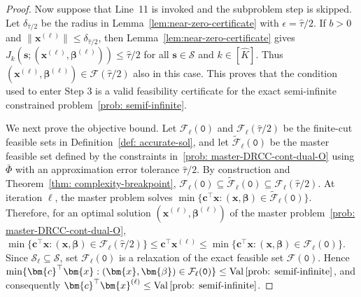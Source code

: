 \documentclass[opre,sglanonrev]{informs4}
\newcommand{\mF}{\mathcal{F}}
\newcommand{\mS}{\mathcal{S}}
\newcommand{\bbeta}{\bm{\beta}}
\newcommand{\bc}{\bm{c}}
\newcommand{\bs}{\bm{s}}
\newcommand{\bx}{\bm{x}}
\newcommand{\Val}{\operatorname{Val}}
\begin{document}
{\begin{proof}
Now suppose that Line~11 is invoked and the subproblem step is skipped. Let
\(\delta_{\hat{\tau}/2}\) be the radius in
Lemma~\ref{lem:near-zero-certificate} with \(\epsilon=\hat{\tau}/2\). If
\(b>0\) and \(\|\bx^{(\ell)}\|\le\delta_{\hat{\tau}/2}\), then
Lemma~\ref{lem:near-zero-certificate} gives
\(J_k(\bs;(\bx^{(\ell)},\bbeta^{(\ell)}))\le\hat{\tau}/2\) for all
\(\bs\in\mS\) and \(k\in[\hat K]\). Thus
\((\bx^{(\ell)},\bbeta^{(\ell)})\in\mF(\hat{\tau}/2)\) also in this case.
This proves that the condition used to enter Step 3 is a valid feasibility certificate for the
exact semi-infinite constrained problem~\eqref{prob: semif-infinite}.

We next prove the objective bound. Let \(\mF_\ell(\mathtt{0})\) and
\(\mF_\ell(\hat{\tau}/2)\) be the finite-cut feasible sets in
Definition~\ref{def: accurate-sol}, and let
\(\widetilde{\mF}_\ell(\mathtt{0})\) be the master feasible set defined by the constraints in~\eqref{prob: master-DRCC-cont-dual-O} using \(\bar\Phi\) with an approximation error tolerance $\hat{\tau}/2$. By construction and Theorem~\ref{thm: complexity-breakpoint},
\(\mF_\ell(\mathtt{0})\subseteq
\widetilde{\mF}_\ell(\mathtt{0})\subseteq\mF_\ell(\hat{\tau}/2)\). At iteration
\(\ell\), the master problem solves
\(\min\{\bc^\top\bx:(\bx,\bbeta)\in\widetilde{\mF}_\ell(\mathtt{0})\}\).
Therefore, for an optimal solution
\((\bx^{(\ell)},\bbeta^{(\ell)})\) of the master problem~\eqref{prob: master-DRCC-cont-dual-O}, $\min\{\bc^\top\bx:(\bx,\bbeta)\in\mF_\ell(\hat{\tau}/2)\} \le \bc^\top\bx^{(\ell)}
\le
\min\{\bc^\top\bx:(\bx,\bbeta)\in\mF_\ell(\mathtt{0})\}$. 
Since \(\mS_\ell\subseteq\mS\), set
\(\mF_\ell(\mathtt{0})\) is a relaxation of the exact feasible set
\(\mF(\mathtt{0})\). Hence
\(\min\{\bc^\top\bx:(\bx,\bbeta)\in\mF_\ell(\mathtt{0})\}
\le
\Val\eqref{prob: semif-infinite}\), and consequently
\(\bc^\top\bx^{(\ell)}\le\Val\eqref{prob: semif-infinite}\).


\end{proof}}
\end{document}
